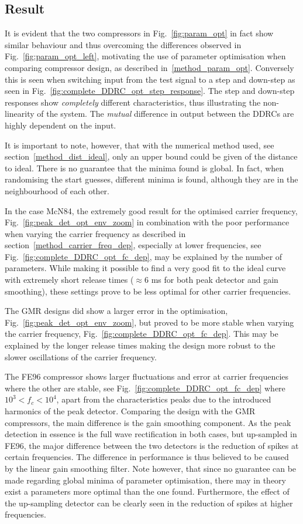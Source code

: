 \documentclass[../main2.tex]{subfiles}
\begin{document}
\subsection{Result}\label{discussion_results}
It is evident that the two compressors in Fig.~\ref{fig:param_opt} in fact show similar behaviour and thus overcoming the differences observed in Fig.~\ref{fig:param_opt_left}, motivating the use of parameter optimisation when comparing compressor design, as described in~\ref{method_param_opt}. Conversely this is seen when switching input from the test signal to a step and down-step as seen in Fig.~\ref{fig:complete_DDRC_opt_step_response}. The step and down-step responses show \emph{completely} different characteristics, thus illustrating the non-linearity of the system. The \emph{mutual} difference in output between the DDRCs are highly dependent on the input.

It is important to note, however, that with the numerical method used, see section~\ref{method_dist_ideal}, only an upper bound could be given of the distance to ideal. There is no guarantee that the minima found is global. In fact, when randomising the start guesses, different minima is found, although they are in the neighbourhood of each other.

In the case McN84, the extremely good result for the optimised carrier frequency, Fig.~\ref{fig:peak_det_opt_env_zoom} in combination with the poor performance when varying the carrier frequency as described in section~\ref{method_carrier_freq_dep}, especially at lower frequencies, see Fig.~\ref{fig:complete_DDRC_opt_fc_dep}, may be explained by the number of parameters. While making it possible to find a very good fit to the ideal curve with extremely short release times ($\approx 6$ ms for both peak detector and gain smoothing), these settings prove to be less optimal for other carrier frequencies.  

The GMR designs did show a larger error in the optimisation, Fig.~\ref{fig:peak_det_opt_env_zoom}, but proved to be more stable when varying the carrier frequency, Fig.~\ref{fig:complete_DDRC_opt_fc_dep}. This may be explained by the longer release times making the design more robust to the slower oscillations of the carrier frequency. 

The FE96 compressor shows larger fluctuations and error at carrier frequencies where the other are stable, see Fig.~\ref{fig:complete_DDRC_opt_fc_dep} where $10^3<f_c<10^4$, apart from the characteristics peaks due to the introduced harmonics of the peak detector. Comparing the design with the GMR compressors, the main difference is the gain smoothing component. As the peak detection in essence is the full wave rectification in both cases, but up-sampled in FE96, the major difference between the two detectors is the reduction of spikes at certain frequencies. The difference in performance is thus believed to be caused by the linear gain smoothing filter. Note however, that since no guarantee can be made regarding global minima of parameter optimisation, there may in theory exist a parameters more optimal than the one found. Furthermore, the effect of the up-sampling detector can be clearly seen in the reduction of spikes at higher frequencies.
\end{document}
